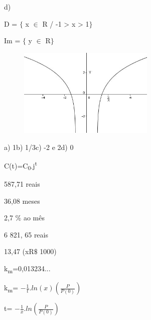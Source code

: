 \begin{respostas}{7}
d)

D = $ \{ $  x $ \in $ R / -1 > x > 1$ \} $ 

Im = $ \{ $  y $ \in $ R$ \} $ 

\begin{figure}[H]
	\begin{Center}
		\includegraphics[width=2.55in,height=1.66in]{capitulos/logaritmos_e_funcao_logaritmica/media/image37.JPG}
	\end{Center}
\end{figure}


\ansitem{}  a) 1\quad \quad b) 1/3\quad \quad c) -2 e 2\quad \quad d) 0

\end{respostas}

\begin{respostas}{8}

    \ansitem{} C(t)=C\textsubscript{0}.j\textsuperscript{t}

    \ansitem{} 587,71 reais

    \ansitem{} 36,08 meses

    \ansitem{} 2,7 $\%$  ao mês 

    \ansitem{} 6 821, 65 reais

    \ansitem{} 13,47 (xR$\$$ 1000)

    \ansitem{} k\textsubscript{m}=0,013234...

    \ansitem{} k\textsubscript{m}=  \( -\frac{1}{t} . ln(x) \left( \frac{P}{P \left( 0 \right) } \right)  \)  

    \ansitem{} t=  \( -\frac{1}{x} .ln \left( \frac{P}{P \left( 0 \right) } \right)  \) 

\end{respostas}